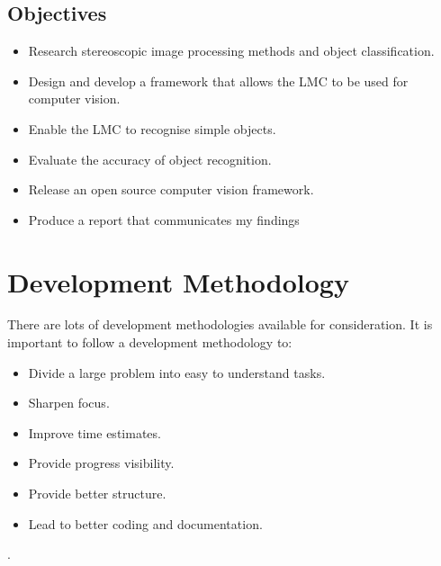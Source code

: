 \documentclass[11pt,oneside]{report}
\begin{document}
		\subsection{Objectives} 
		\begin{itemize}
			\item Research stereoscopic image processing methods and object classification.
			\item Design and develop a framework that allows the LMC to be used for computer vision.
			\item Enable the LMC to recognise simple objects.
			\item Evaluate the accuracy of object recognition.
			\item Release an open source computer vision framework.
			\item Produce a report that communicates my findings
		\end{itemize}
			
		\section{Development Methodology}
					There are lots of development methodologies available for consideration.
					It is important to follow a development methodology to:
					\begin{itemize}
						\item Divide a large problem into easy to understand tasks.
						\item Sharpen focus.
						\item Improve time estimates.
						\item Provide progress visibility.
						\item Provide better structure.
						\item Lead to better coding and documentation.
					\end{itemize}\cite{book:dawson}.
					
\end{document}
